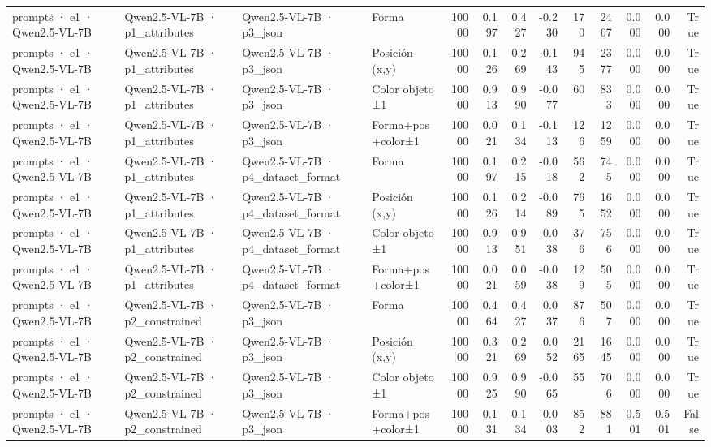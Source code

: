 \begin{tabular}{llllrrrrrrrrr}
prompts · e1 · Qwen2.5-VL-7B & Qwen2.5-VL-7B · p1\_attributes & Qwen2.5-VL-7B · p3\_json & Forma & 10000 & 0.197 & 0.427 & -0.230 & 170 & 2467 & 0.000 & 0.000 & True \\
prompts · e1 · Qwen2.5-VL-7B & Qwen2.5-VL-7B · p1\_attributes & Qwen2.5-VL-7B · p3\_json & Posición (x,y) & 10000 & 0.126 & 0.269 & -0.143 & 945 & 2377 & 0.000 & 0.000 & True \\
prompts · e1 · Qwen2.5-VL-7B & Qwen2.5-VL-7B · p1\_attributes & Qwen2.5-VL-7B · p3\_json & Color objeto ±1 & 10000 & 0.913 & 0.990 & -0.077 & 60 & 833 & 0.000 & 0.000 & True \\
prompts · e1 · Qwen2.5-VL-7B & Qwen2.5-VL-7B · p1\_attributes & Qwen2.5-VL-7B · p3\_json & Forma+pos+color±1 & 10000 & 0.021 & 0.134 & -0.113 & 126 & 1259 & 0.000 & 0.000 & True \\
prompts · e1 · Qwen2.5-VL-7B & Qwen2.5-VL-7B · p1\_attributes & Qwen2.5-VL-7B · p4\_dataset\_format & Forma & 10000 & 0.197 & 0.215 & -0.018 & 562 & 745 & 0.000 & 0.000 & True \\
prompts · e1 · Qwen2.5-VL-7B & Qwen2.5-VL-7B · p1\_attributes & Qwen2.5-VL-7B · p4\_dataset\_format & Posición (x,y) & 10000 & 0.126 & 0.214 & -0.089 & 765 & 1652 & 0.000 & 0.000 & True \\
prompts · e1 · Qwen2.5-VL-7B & Qwen2.5-VL-7B · p1\_attributes & Qwen2.5-VL-7B · p4\_dataset\_format & Color objeto ±1 & 10000 & 0.913 & 0.951 & -0.038 & 376 & 756 & 0.000 & 0.000 & True \\
prompts · e1 · Qwen2.5-VL-7B & Qwen2.5-VL-7B · p1\_attributes & Qwen2.5-VL-7B · p4\_dataset\_format & Forma+pos+color±1 & 10000 & 0.021 & 0.059 & -0.038 & 129 & 505 & 0.000 & 0.000 & True \\
prompts · e1 · Qwen2.5-VL-7B & Qwen2.5-VL-7B · p2\_constrained & Qwen2.5-VL-7B · p3\_json & Forma & 10000 & 0.464 & 0.427 & 0.037 & 876 & 507 & 0.000 & 0.000 & True \\
prompts · e1 · Qwen2.5-VL-7B & Qwen2.5-VL-7B · p2\_constrained & Qwen2.5-VL-7B · p3\_json & Posición (x,y) & 10000 & 0.321 & 0.269 & 0.052 & 2165 & 1645 & 0.000 & 0.000 & True \\
prompts · e1 · Qwen2.5-VL-7B & Qwen2.5-VL-7B · p2\_constrained & Qwen2.5-VL-7B · p3\_json & Color objeto ±1 & 10000 & 0.925 & 0.990 & -0.065 & 55 & 706 & 0.000 & 0.000 & True \\
prompts · e1 · Qwen2.5-VL-7B & Qwen2.5-VL-7B · p2\_constrained & Qwen2.5-VL-7B · p3\_json & Forma+pos+color±1 & 10000 & 0.131 & 0.134 & -0.003 & 852 & 881 & 0.501 & 0.501 & False \\

\end{tabular}
